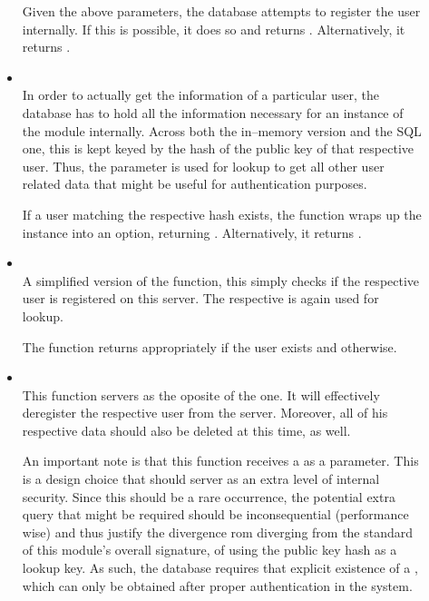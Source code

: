 \begin{description}
\begin{itemize}
  Given the above parameters, the database attempts to register the user internally.
  If this is possible, it does so and returns .
  Alternatively, it returns .

  \item {} \\
  In order to actually get the information of a particular user, the database has to hold all the information necessary for an instance of the  module internally.
  Across both the in--memory version and the SQL one, this is kept keyed by the hash of the public key of that respective user.
  Thus, the parameter  is used for lookup to get all other user related data that might be useful for authentication purposes.

  If a user matching the respective hash exists, the function wraps up the  instance into an option, returning .
  Alternatively, it returns .

  \item {} \\
  A simplified version of the  function, this simply checks if the respective user is registered on this server.
  The respective  is again used for lookup.

  The function returns appropriately  if the user exists and  otherwise.

  \item {} \\
  This function servers as the oposite of the  one.
  It will effectively deregister the respective user from the server.
  Moreover, all of his respective data should also be deleted at this time, as well.

  An important note is that this function receives a  as a parameter.
  This is a design choice that should server as an extra level of internal security.
  Since this should be a rare occurrence, the potential extra query that might be required should be inconsequential (performance wise) and thus justify the divergence rom diverging from the standard of this module's overall signature, of using the public key hash as a lookup key.
  As such, the database requires that explicit existence of a , which can only be obtained after proper authentication in the system.


\end{itemize}
\end{description}
